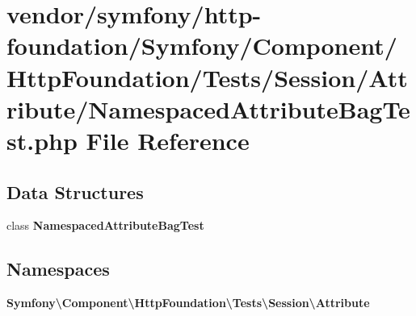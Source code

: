\section{vendor/symfony/http-\/foundation/\+Symfony/\+Component/\+Http\+Foundation/\+Tests/\+Session/\+Attribute/\+Namespaced\+Attribute\+Bag\+Test.php File Reference}
\label{_namespaced_attribute_bag_test_8php}
\subsection*{Data Structures}
\begin{DoxyCompactItemize}
\item 
class {\bf Namespaced\+Attribute\+Bag\+Test}
\end{DoxyCompactItemize}
\subsection*{Namespaces}
\begin{DoxyCompactItemize}
\item 
 {\bf Symfony\textbackslash{}\+Component\textbackslash{}\+Http\+Foundation\textbackslash{}\+Tests\textbackslash{}\+Session\textbackslash{}\+Attribute}
\end{DoxyCompactItemize}
